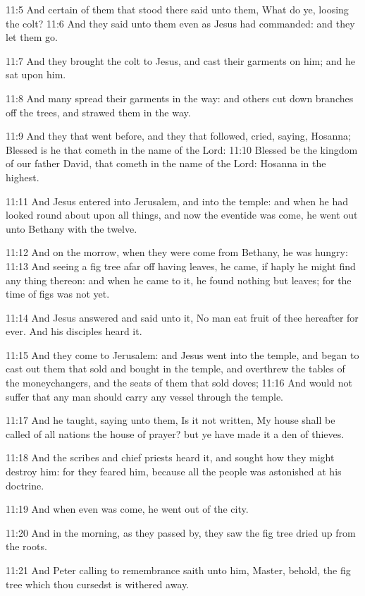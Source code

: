 11:5 And certain of them that stood there said unto them, What do ye, loosing the colt?  11:6 And they said unto them even as Jesus had commanded: and they let them go.

11:7 And they brought the colt to Jesus, and cast their garments on him; and he sat upon him.

11:8 And many spread their garments in the way: and others cut down branches off the trees, and strawed them in the way.

11:9 And they that went before, and they that followed, cried, saying, Hosanna; Blessed is he that cometh in the name of the Lord: 11:10 Blessed be the kingdom of our father David, that cometh in the name of the Lord: Hosanna in the highest.

11:11 And Jesus entered into Jerusalem, and into the temple: and when he had looked round about upon all things, and now the eventide was come, he went out unto Bethany with the twelve.

11:12 And on the morrow, when they were come from Bethany, he was hungry: 11:13 And seeing a fig tree afar off having leaves, he came, if haply he might find any thing thereon: and when he came to it, he found nothing but leaves; for the time of figs was not yet.

11:14 And Jesus answered and said unto it, No man eat fruit of thee hereafter for ever. And his disciples heard it.

11:15 And they come to Jerusalem: and Jesus went into the temple, and began to cast out them that sold and bought in the temple, and overthrew the tables of the moneychangers, and the seats of them that sold doves; 11:16 And would not suffer that any man should carry any vessel through the temple.

11:17 And he taught, saying unto them, Is it not written, My house shall be called of all nations the house of prayer? but ye have made it a den of thieves.

11:18 And the scribes and chief priests heard it, and sought how they might destroy him: for they feared him, because all the people was astonished at his doctrine.

11:19 And when even was come, he went out of the city.

11:20 And in the morning, as they passed by, they saw the fig tree dried up from the roots.

11:21 And Peter calling to remembrance saith unto him, Master, behold, the fig tree which thou cursedst is withered away.

